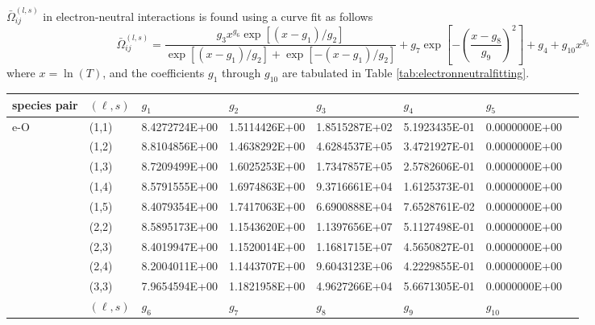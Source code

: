 \documentclass{warpdoc}
\renewcommand{\fontsizetable}{\footnotesize\scalefont{1.0}}
\begin{document}
$\bar{\Omega}_{i j}^{(l, s)}$ in electron-neutral interactions is found using a curve fit \cite{tepjd:2009:laricchiuta} as follows
\begin{equation}\label{eq:electronneutralfitting}
\bar{\Omega}_{i j}^{(l, s)}= \frac{g_{3} x^{g_{6}} \exp \left[\left(x-g_{1}\right) / g_{2}\right]}{\exp \left[\left(x-g_{1}\right) / g_{2}\right]+\exp \left[-\left(x-g_{1}\right) / g_{2}\right]} +g_{7} \exp \left[-\left(\frac{x-g_{8}}{g_{9}}\right)^{2}\right]+g_{4}+g_{10} x^{g_{5}}
\end{equation}
where $x=\ln \left(T\right)$, and the coefficients $g_1$ through $g_{10}$ are tabulated in Table \ref{tab:electronneutralfitting}.

%
\begin{table}[h]
\fontsizetable
\begin{center}
  \begin{threeparttable}
    \fontsizetable
    \begin{tabular*}{\textwidth}{@{\extracolsep{\fill}}llllllll}
      \toprule
species pair & $(\ell,s)$ & $g_1$ & $g_2$ & $g_3$ & $g_4$ & $g_5$ \\
\midrule
\multirow{19}{*}{e-O} &	(1,1)	&	8.4272724E+00	&	1.5114426E+00	&	1.8515287E+02	&	5.1923435E-01	&	0.0000000E+00 \\
&	(1,2)	&	8.8104856E+00	&	1.4638292E+00	&	4.6284537E+05	&	3.4721927E-01	&	0.0000000E+00 \\
&	(1,3)	&	8.7209499E+00	&	1.6025253E+00	&	1.7347857E+05	&	2.5782606E-01	&	0.0000000E+00 \\
&	(1,4)	&	8.5791555E+00	&	1.6974863E+00	&	9.3716661E+04	&	1.6125373E-01	&	0.0000000E+00 \\
&	(1,5)	&	8.4079354E+00	&	1.7417063E+00	&	6.6900888E+04	&	7.6528761E-02	&	0.0000000E+00 \\
&	(2,2)	&	8.5895173E+00	&	1.1543620E+00	&	1.1397656E+07	&	5.1127498E-01	&	0.0000000E+00 \\
&	(2,3)	&	8.4019947E+00	&	1.1520014E+00	&	1.1681715E+07	&	4.5650827E-01	&	0.0000000E+00 \\
&	(2,4)	&	8.2004011E+00	&	1.1443707E+00	&	9.6043123E+06	&	4.2229855E-01	&	0.0000000E+00 \\
&	(3,3)	&	7.9654594E+00	&	1.1821958E+00	&	4.9627266E+04	&	5.6671305E-01	&	0.0000000E+00 \\
\cmidrule(lr{1em}){2-7}
 & $(\ell,s)$ & $g_6$ & $g_7$ & $g_8$ & $g_9$ & $g_{10}$ \\

\end{tabular*}
\end{threeparttable}
\end{center}
\end{table}
\end{document}
